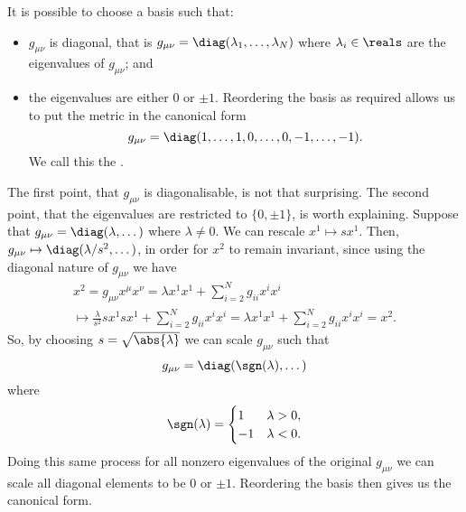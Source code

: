 \documentclass[fleqn]{NotesClass}
\begin{document}
    It is possible to choose a basis such that:
    \begin{itemize}
        \item \(g_{\mu\nu}\) is diagonal, that is \(g_{\mu\nu} = \diag(\lambda_1, \dotsc, \lambda_N)\) where \(\lambda_i \in \reals\) are the eigenvalues of \(g_{\mu\nu}\); and
        \item the eigenvalues are either \(0\) or \(\pm 1\).
        Reordering the basis as required allows us to put the metric in the canonical form
        \begin{equation}
            g_{\mu\nu} = \diag(1, \dotsc, 1, 0, \dotsc, 0, -1, \dotsc, -1).
        \end{equation}
        We call this the .
    \end{itemize}

    The first point, that \(g_{\mu\nu}\) is diagonalisable, is not that surprising.
    The second point, that the eigenvalues are restricted to \(\{0, \pm 1\}\), is worth explaining.
    Suppose that \(g_{\mu\nu} = \diag(\lambda, \dotsc)\) where \(\lambda \ne 0\).
    We can rescale \(x^1 \mapsto sx^1\).
    Then, \(g_{\mu\nu} \mapsto \diag(\lambda/s^2, \dotsc)\), in order for \(x^2\) to remain invariant, since using the diagonal nature of \(g_{\mu\nu}\) we have
    \begin{multline}
        x^2 = g_{\mu\nu}x^\mu x^\nu = \lambda x^1 x^1 + \sum_{i = 2}^{N} g_{ii}x^ix^i\\
        \mapsto \frac{\lambda}{s^2}sx^1sx^1 + \sum_{i = 2}^{N} g_{ii}x^ix^i = \lambda x^1x^1 + \sum_{i = 2}^{N} g_{ii}x^ix^i = x^2.
    \end{multline}
    So, by choosing \(s = \sqrt{\abs{\lambda}}\) we can scale \(g_{\mu\nu}\) such that
    \begin{equation}
        g_{\mu\nu} = \diag(\sgn(\lambda), \dotsc)
    \end{equation}
    where
    \begin{equation}
        \sgn(\lambda) =
        \begin{cases}
            1 & \lambda > 0,\\
            -1 & \lambda < 0.
        \end{cases}
    \end{equation}
    Doing this same process for all nonzero eigenvalues of the original \(g_{\mu\nu}\) we can scale all diagonal elements to be \(0\) or \(\pm 1\).
    Reordering the basis then gives us the canonical form.
    
\end{document}
